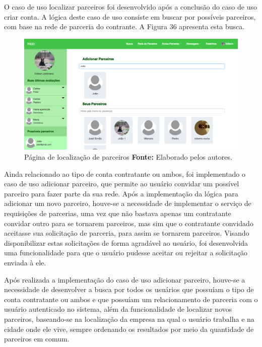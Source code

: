 \par O caso de uso localizar parceiros foi desenvolvido após a conclusão do caso de uso criar conta. A lógica deste caso de uso consiste em buscar por possíveis parceiros, com base na rede de parceria do contrante. A Figura 36 apresenta esta busca.

\begin{figure}[h!]
	\centerline{\includegraphics[scale=0.35]{./imagens/localizar-parceiro.png}}
	\caption[Página de localização de parceiros]
	{Página de localização de parceiros \textbf{Fonte:} Elaborado pelos autores.}
	\label{fig:exemplo1}
\end{figure}

\newpage



\par Ainda relacionado ao tipo de conta contratante ou ambos, foi implementado o caso de uso adicionar parceiro, que permite ao usuário convidar um possível parceiro para fazer parte da sua rede. Após a implementação da lógica para adicionar um novo parceiro, houve-se a necessidade de implementar o serviço de requisições de parcerias, uma vez que não bastava apenas um contratante convidar outro para se tornarem parceiros, mas sim que o contratante convidado aceitasse sua solicitação de parceria, para assim se tornarem parceiros. Visando disponibilizar estas solicitações de forma agradável ao usuário, foi desenvolvida uma funcionalidade para que o usuário pudesse aceitar ou rejeitar a solicitação enviada à ele.

\par Após realizada a implementação do caso de uso adicionar parceiro, houve-se a necessidade de desenvolver a busca por todos os usuários que possuíam o tipo de conta contratante ou ambos e que possuíam um relacionamento de parceria com o usuário autenticado no sistema, além da funcionalidade de localizar novos parceiros, baseando-se na localização da empresa na qual o usuário trabalha e na cidade onde ele vive, sempre ordenando os resultados por meio da quantidade de parceiros em comum. 

